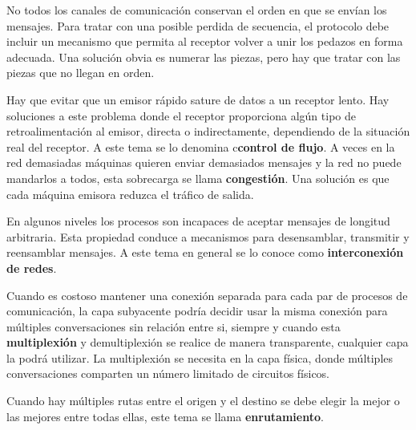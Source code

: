 \documentclass[10pt,a4paper]{report}
\begin{document}
\par No todos los canales de comunicación conservan el orden en que se envían los 
mensajes. Para tratar con una posible perdida de secuencia, el protocolo debe incluir 
un mecanismo que permita al receptor volver a unir los pedazos en forma adecuada. 
Una solución obvia es numerar las piezas, pero hay que tratar con las piezas que no 
llegan en orden.

\par Hay que evitar que un emisor rápido sature de datos a un receptor lento. Hay 
soluciones a este problema donde el receptor proporciona algún tipo de 
retroalimentación al emisor, directa o indirectamente, dependiendo de la situación real 
del receptor. A este tema se lo denomina c\textbf{control de flujo}. A veces en la red 
demasiadas máquinas quieren enviar demasiados mensajes y la red no puede 
mandarlos a todos, esta sobrecarga se llama \textbf{congestión}. Una solución es que 
cada máquina emisora reduzca el tráfico de salida.

\par En algunos niveles los procesos son incapaces de aceptar mensajes de longitud 
arbitraria. Esta propiedad conduce a mecanismos para desensamblar, transmitir y 
reensamblar mensajes. A este tema en general se lo conoce como 
\textbf{interconexión de redes}.

\par Cuando es costoso mantener una conexión separada para cada par de procesos 
de comunicación, la capa subyacente podría decidir usar la misma conexión para 
múltiples conversaciones sin relación entre si, siempre y cuando esta 
\textbf{multiplexión} y demultiplexión se realice de manera transparente, cualquier 
capa la podrá utilizar. La multiplexión se necesita en la capa física, donde múltiples 
conversaciones comparten un número limitado de circuitos físicos.

\par Cuando hay múltiples rutas entre el origen y el destino se debe elegir la mejor o 
las mejores entre todas ellas, este tema se llama \textbf{enrutamiento}.
\end{document}
